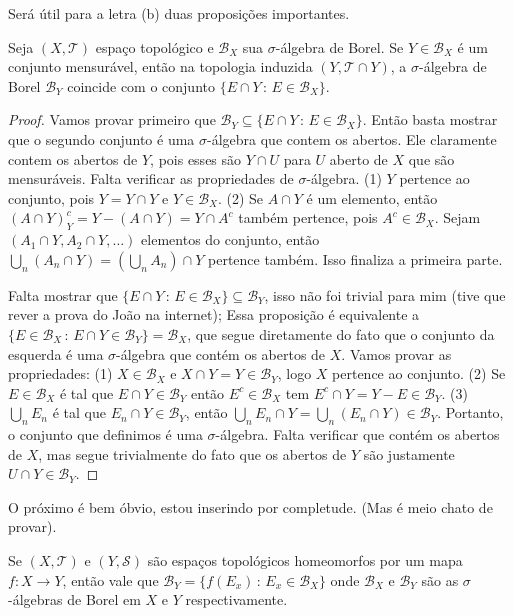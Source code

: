 Será útil para a letra (b) duas proposições importantes.
\begin{prop} \label{prop:borel_induzido}
    Seja $(X,\mathcal{T})$ espaço topológico e $\mathcal{B}_X$ sua $\sigma$-álgebra de Borel. Se $Y \in \mathcal{B}_X$ é um conjunto mensurável, então na topologia induzida $(Y,\mathcal{T} \cap Y)$, a $\sigma$-álgebra de Borel $\mathcal{B}_Y$ coincide com o conjunto $\{E \cap Y \, : \, E \in \mathcal{B}_X\}$.
\end{prop}
\begin{proof} 
    Vamos provar primeiro que $\mathcal{B}_Y \subseteq \{E \cap Y \, : \, E \in \mathcal{B}_X\}$.
    Então basta mostrar que o segundo conjunto é uma $\sigma$-álgebra que contem os abertos.
    Ele claramente contem os abertos de $Y$, pois esses são $Y \cap U$ para $U$ aberto de $X$ que são mensuráveis. Falta verificar as propriedades de $\sigma$-álgebra. (1) $Y$ pertence ao conjunto, pois $Y = Y \cap Y$ e $Y \in \mathcal{B}_X$. (2) Se $A \cap Y$ é um elemento, então
    $(A \cap Y)^c_Y = Y - (A \cap Y) = Y \cap A^c$ também pertence, pois $A^c \in \mathcal{B}_X$. Sejam $(A_1\cap Y, A_2 \cap Y, \dots)$ elementos do conjunto, então $\bigcup_n (A_n \cap Y) = (\bigcup_n A_n) \cap Y$ pertence também. Isso finaliza a primeira parte.

    Falta mostrar que $\{E \cap Y \, : \, E \in \mathcal{B}_X\} \subseteq \mathcal{B}_Y$, isso não foi trivial para mim (tive que rever a prova do João na internet); Essa proposição é equivalente a $\{E \in \mathcal{B}_X \, : \, E \cap Y \in \mathcal{B}_Y\} = \mathcal{B}_X$, que segue diretamente do fato que o conjunto da esquerda é uma $\sigma$-álgebra que contém os abertos de $X$. Vamos provar as propriedades: (1) $X \in \mathcal{B}_X$ e $X \cap Y = Y \in \mathcal{B}_Y$, logo $X$ pertence ao conjunto. (2) Se $E \in \mathcal{B}_X$ é tal que $E \cap Y \in \mathcal{B}_Y$ então $E^c \in \mathcal{B}_X$ tem $E^c \cap Y = Y - E \in \mathcal{B}_Y$.
    (3) $\bigcup_n E_n$ é tal que $E_n \cap Y \in \mathcal{B}_Y$, então $\bigcup_n E_n \cap Y = \bigcup_n (E_n \cap Y) \in \mathcal{B}_Y$. Portanto, o conjunto que definimos é uma $\sigma$-álgebra. Falta verificar que contém os abertos de $X$, mas segue trivialmente do fato que os abertos de $Y$ são justamente $U \cap Y \in \mathcal{B}_Y$.
\end{proof}
    O próximo é bem óbvio, estou inserindo por completude. (Mas é meio chato de provar).
\begin{prop} \label{prop:borel_homeomorphism}
    Se $(X,\mathcal{T})$ e $(Y,\mathcal{S})$ são espaços topológicos homeomorfos por um mapa $f:X \to Y$, então vale que $\mathcal{B}_Y = \{f(E_x) \, : \, E_x \in \mathcal{B}_X\}$ 
    onde $\mathcal{B}_X$ e $\mathcal{B}_Y$ são as $\sigma$-álgebras de Borel em $X$ e $Y$ respectivamente. 
\end{prop}

